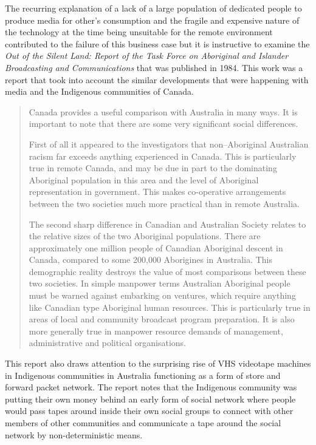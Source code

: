 The recurring explanation of a lack of a large population of dedicated people to produce media for other's consumption and the fragile and expensive nature of the technology at the time being unsuitable for the remote environment contributed to the failure of this business case but it is instructive to examine the \emph{Out of the Silent Land: Report of the Task Force on Aboriginal and Islander Broadcasting and Communications} that was published in 1984\cite{RefWorks:79}.
This work was a report that took into account the similar developments that were happening with media and the Indigenous communities of Canada.
\begin{quotation}
Canada provides a useful comparison with Australia in many ways. It is important to note that there are some very significant social differences.

First of all it appeared to the investigators that non--Aboriginal Australian racism far exceeds anything experienced in Canada. This is particularly true in remote Canada, and may be due in part to the dominating Aboriginal population in this area and the level of Aboriginal representation in government. This makes co-operative arrangements between the two societies much more practical than in remote Australia.

The second sharp difference in Canadian and Australian Society relates to the relative sizes of the two Aboriginal populations. There are approximately one million people of Canadian Aboriginal descent in Canada, compared to some 200,000 Aborigines in Australia. This demographic reality destroys the value of most comparisons between these two societies. In simple manpower terms Australian Aboriginal people must be warned against embarking on ventures, which require anything like Canadian type Aboriginal human resources. This is particularly true in areas of local and community broadcast program preparation. It is also more generally true in manpower resource demands of management, administrative and political organisations\cite[p116]{RefWorks:79}.
\end{quotation}

This report also draws attention to the surprising rise of VHS videotape machines in Indigenous communities in Australia functioning as a form of store and forward packet network. The report notes that the Indigenous community was putting their own money behind an early form of social network where people would pass tapes around inside their own social groups to connect with other members of other communities and communicate a tape around the social network by non-deterministic means. 


